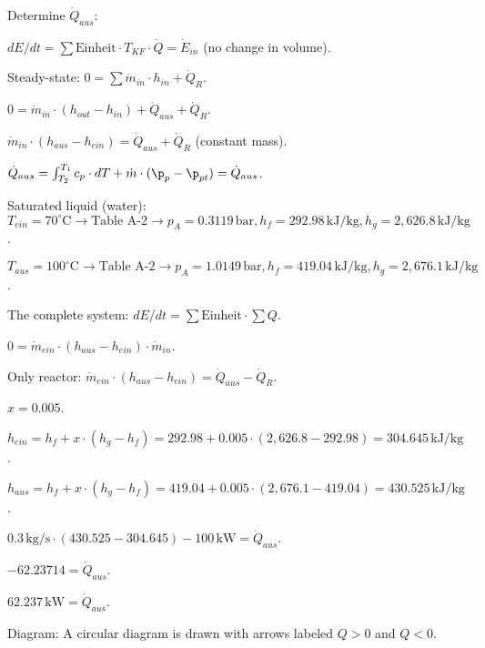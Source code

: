 Determine \( \dot{Q}_{aus} \):  

\( dE/dt = \sum \text{Einheit} \cdot T_{KF} \cdot \dot{Q} = \dot{E}_{in} \) (no change in volume).  

Steady-state:  
\( 0 = \sum \dot{m}_{in} \cdot h_{in} + \dot{Q}_{R} \).  

\( 0 = \dot{m}_{in} \cdot (h_{out} - h_{in}) + \dot{Q}_{aus} + \dot{Q}_{R} \).  

\( \dot{m}_{in} \cdot (h_{aus} - h_{ein}) = \dot{Q}_{aus} + \dot{Q}_{R} \) (constant mass).  

\( \dot{Q}_{aus} = \int_{T_{2}}^{T_{1}} c_{p} \cdot dT + \dot{m} \cdot (\p_{p} - \p_{pt}) = \dot{Q}_{aus} \).  

Saturated liquid (water):  
\( T_{ein} = 70^\circ \text{C} \rightarrow \text{Table A-2} \rightarrow p_{A} = 0.3119 \, \text{bar}, h_{f} = 292.98 \, \text{kJ/kg}, h_{g} = 2,626.8 \, \text{kJ/kg} \).  

\( T_{aus} = 100^\circ \text{C} \rightarrow \text{Table A-2} \rightarrow p_{A} = 1.0149 \, \text{bar}, h_{f} = 419.04 \, \text{kJ/kg}, h_{g} = 2,676.1 \, \text{kJ/kg} \).  

The complete system:  
\( dE/dt = \sum \text{Einheit} \cdot \sum Q \).  

\( 0 = \dot{m}_{ein} \cdot (h_{aus} - h_{ein}) \cdot \dot{m}_{in} \).  

Only reactor:  
\( \dot{m}_{ein} \cdot (h_{aus} - h_{ein}) = \dot{Q}_{aus} - \dot{Q}_{R} \).  

\( x = 0.005 \).  

\( h_{ein} = h_{f} + x \cdot (h_{g} - h_{f}) = 292.98 + 0.005 \cdot (2,626.8 - 292.98) = 304.645 \, \text{kJ/kg} \).  

\( h_{aus} = h_{f} + x \cdot (h_{g} - h_{f}) = 419.04 + 0.005 \cdot (2,676.1 - 419.04) = 430.525 \, \text{kJ/kg} \).  

\( 0.3 \, \text{kg/s} \cdot (430.525 - 304.645) - 100 \, \text{kW} = \dot{Q}_{aus} \).  

\( -62.23714 = \dot{Q}_{aus} \).  

\( 62.237 \, \text{kW} = \dot{Q}_{aus} \).  

Diagram:  
A circular diagram is drawn with arrows labeled \( Q > 0 \) and \( Q < 0 \).